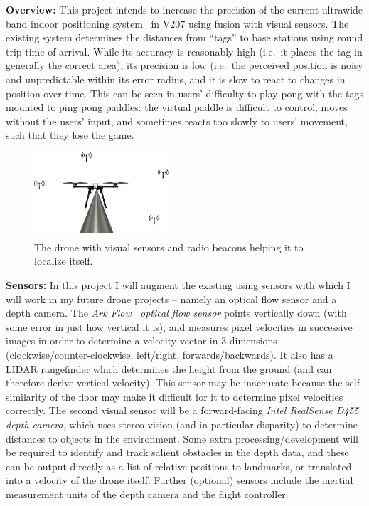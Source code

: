 \vspace*{-1cm}
\textbf{Overview:}
This project intends to increase the precision of the current ultrawide band indoor positioning system~\cite{decawave_product_brief}
in V207 using fusion with visual sensors.
The existing system determines the distances from ``tags'' to base stations using round trip
time of arrival.
While its accuracy is reasonably high (i.e.~it places the tag in generally the correct area),
its precision is low (i.e.~the perceived position is noisy and unpredictable within its error radius,
and it is slow to react to changes in position over time.
This can be seen in users' difficulty to play pong with the tags mounted to ping pong paddles:
the virtual paddle is difficult to control, moves without the users' input,
and sometimes reacts too slowly to users' movement,
such that they lose the game.

\begin{figure}
	\centering
	\includegraphics[width=5cm]{./images/sketch.png}
	\caption{The drone with visual sensors and radio beacons helping it to localize itself.}
\end{figure}

\textbf{Sensors:}
In this project I will augment the existing using sensors with which I will work in my future drone
projects -- namely an optical flow sensor and a depth camera.
The \emph{Ark Flow~\cite{arkflow} optical flow sensor} points vertically down
(with some error in just how vertical it is),
and measures pixel velocities in successive images in order to determine a velocity vector in 3
dimensions (clockwise/counter-clockwise, left/right, forwards/backwards).
It also has a LIDAR rangefinder which determines the height from the ground
(and can therefore derive vertical velocity).
This sensor may be inaccurate because the self-similarity of the floor may make it difficult
for it to determine pixel velocities correctly.
The second visual sensor will be a forward-facing \emph{Intel RealSense D455 depth camera},
which uses stereo vision (and in particular disparity) to determine distances to objects
in the environment.
Some extra processing/development will be required to identify and track salient obstacles in the
depth data, and these can be output directly as a list of relative positions to landmarks,
or translated into a velocity of the drone itself.
Further (optional) sensors include the inertial measurement units
of the depth camera and the flight controller.

